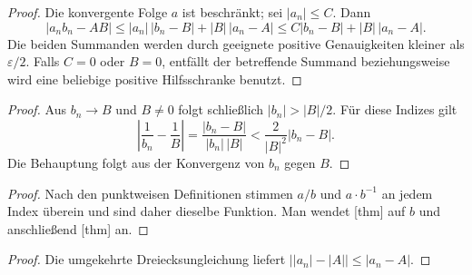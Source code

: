 \documentclass[main.tex]{subfiles}
\begin{document}
\begin{proof}
Die konvergente Folge \(a\) ist beschränkt; sei \(|a_n|\leq C\). Dann
\[
 |a_nb_n-AB|
 \leq |a_n|\,|b_n-B|+|B|\,|a_n-A|
 \leq C|b_n-B|+|B|\,|a_n-A|.
\]
Die beiden Summanden werden durch geeignete positive Genauigkeiten kleiner
als \(\varepsilon/2\). Falls \(C=0\) oder \(B=0\), entfällt der betreffende
Summand beziehungsweise wird eine beliebige positive Hilfsschranke benutzt.
\end{proof}

\begin{proof}
Aus \(b_n\to B\) und \(B\neq0\) folgt schließlich
\(|b_n|>|B|/2\). Für diese Indizes gilt
\[
 \left|\frac1{b_n}-\frac1B\right|
 =\frac{|b_n-B|}{|b_n|\,|B|}
 <\frac{2}{|B|^2}|b_n-B|.
\]
Die Behauptung folgt aus der Konvergenz von \(b_n\) gegen \(B\).
\end{proof}

\begin{proof}
Nach den punktweisen Definitionen stimmen \(a/b\) und
\(a\mathbin{\cdot}b^{-1}\) an jedem Index überein und sind daher dieselbe
Funktion. Man wendet
[thm] auf \(b\) und
anschließend [thm] an.
\end{proof}

\begin{proof}
Die umgekehrte Dreiecksungleichung liefert
\(\bigl||a_n|-|A|\bigr|\leq|a_n-A|\).
\end{proof}
\end{document}

